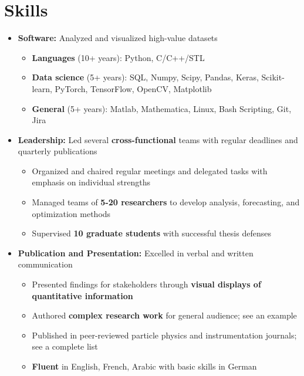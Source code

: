 \documentclass{myfancycv}
\begin{document}
\section{Skills}
\begin{itemize}

\item {\textbf{Software:} Analyzed and visualized high-value datasets
{\begin{itemize}\setlength\itemindent{-2.2em}
\item {\bf Languages} (10+ years): Python, C/C++/STL
\item {\bf Data science} (5+ years): SQL, Numpy, Scipy, Pandas, Keras, Scikit-learn, PyTorch, TensorFlow, OpenCV, Matplotlib
\item {\bf General} (5+ years): Matlab, Mathematica, Linux, Bash Scripting, Git, Jira
\end{itemize}
}
}

\vspace{6pt}

\item {\textbf{Leadership:} Led several {\bf cross-functional} teams with regular deadlines and quarterly publications
{\begin{itemize}\setlength\itemindent{-2.2em}
    \item Organized and chaired regular meetings and delegated tasks with emphasis on individual strengths
    \item Managed teams of {\bf 5-20 researchers} to develop analysis, forecasting, and optimization methods
    \item Supervised {\bf10 graduate students} with successful thesis defenses
\end{itemize}}%
}

\vspace{6pt}

\item{ \textbf{Publication and Presentation:} Excelled in verbal and written communication
{\begin{itemize}\setlength\itemindent{-2.2em}
\item Presented findings for stakeholders through {\bf visual displays of quantitative information}
\item Authored {\bf complex research work} for general audience; see an example \href{http://atlas.cern/updates/physics-briefing/probing-dark-matter-higgs-boson}{}
\item Published in peer-reviewed particle physics and instrumentation journals; see a complete list \href{https://orcid.org/0000-0002-9169-0793}{}
\item {\bf Fluent} in English, French, Arabic with basic skills in German

\end{itemize}}%
}


\end{itemize}
\end{document}
